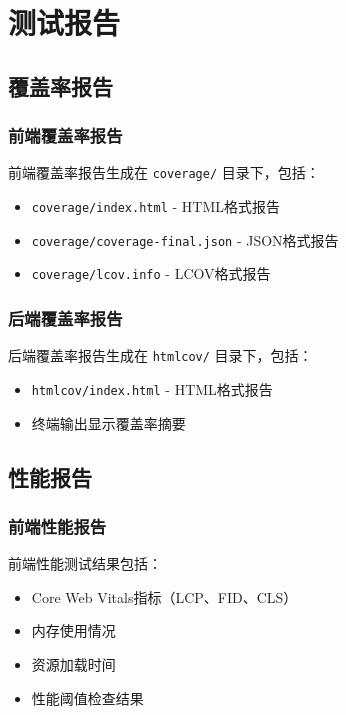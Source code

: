\documentclass[12pt,a4paper,openany]{report}
\begin{document}
\section{测试报告}

\subsection{覆盖率报告}

\subsubsection{前端覆盖率报告}

前端覆盖率报告生成在 \texttt{coverage/} 目录下，包括：

\begin{itemize}
    \item \texttt{coverage/index.html} - HTML格式报告
    \item \texttt{coverage/coverage-final.json} - JSON格式报告
    \item \texttt{coverage/lcov.info} - LCOV格式报告
\end{itemize}

\subsubsection{后端覆盖率报告}

后端覆盖率报告生成在 \texttt{htmlcov/} 目录下，包括：

\begin{itemize}
    \item \texttt{htmlcov/index.html} - HTML格式报告
    \item 终端输出显示覆盖率摘要
\end{itemize}

\subsection{性能报告}

\subsubsection{前端性能报告}

前端性能测试结果包括：

\begin{itemize}
    \item Core Web Vitals指标（LCP、FID、CLS）
    \item 内存使用情况
    \item 资源加载时间
    \item 性能阈值检查结果
\end{itemize}
\end{document}
